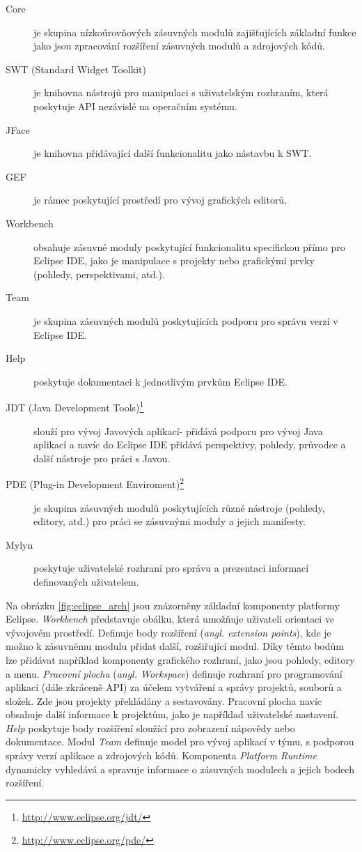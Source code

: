   \begin{description}
    \item[Core] je skupina nízkoúrovňových zásuvných modulů zajišťujících základní funkce jako jsou zpracování rozšíření zásuvných modulů a zdrojových kódů.
    \item[SWT (Standard Widget Toolkit)] je knihovna nástrojů pro manipulaci s uživatelským rozhraním, která poskytuje API nezávislé na operačním systému.
    \item[JFace] je knihovna přidávající další funkcionalitu jako nástavbu k SWT.
    \item[GEF] je rámec poskytující prostředí pro vývoj grafických editorů.
    \item[Workbench] obsahuje zásuvné moduly poskytující funkcionalitu specifickou přímo pro Eclipse IDE, jako je manipulace s projekty nebo grafickými prvky (pohledy, perspektivami, atd.).
    \item[Team] je skupina zásuvných modulů poskytujících podporu pro správu verzí v Eclipse IDE.
    \item[Help] poskytuje dokumentaci k jednotlivým prvkům Eclipse IDE.
    \item[JDT (Java Development Tools)\footnote{\url{http://www.eclipse.org/jdt/}}] slouží pro vývoj Javových aplikací- přidává podporu pro vývoj Java aplikací a navíc do Eclipse IDE přidává perspektivy, pohledy, průvodce a další nástroje pro práci s Javou.
    \item[PDE (Plug-in Development Enviroment)\footnote{\url{http://www.eclipse.org/pde/}}] je skupina zásuvných modulů poskytujících různé nástroje (pohledy, editory, atd.) pro práci se zásuvnými moduly a jejich manifesty.
    \item[Mylyn] poskytuje uživatelské rozhraní pro správu a prezentaci informací definovaných uživatelem.
  \end{description}

  Na obrázku \ref{fig:eclipse_arch} jsou znázorněny základní komponenty platformy Eclipse. \emph{Workbench} představuje obálku, která umožňuje uživateli orientaci ve vývojovém prostředí. Definuje body rozšíření (\emph{angl. extension points}), kde je možno k zásuvnému modulu přidat další, rozšiřující modul. Díky těmto bodům lze přidávat například komponenty grafického rozhraní, jako jsou pohledy, editory a menu. \emph{Pracovní plocha} (\emph{angl. Workspace}) definuje rozhraní pro programování aplikací (dále zkráceně API) za účelem vytváření a správy projektů, souborů a složek. Zde jsou projekty překládány a sestavovány. Pracovní plocha navíc obsahuje další informace k projektům, jako je například uživatelské nastavení. \emph{Help} poskytuje body rozšíření sloužící pro zobrazení nápovědy nebo dokumentace. Modul \emph{Team} definuje model pro vývoj aplikací v týmu, s podporou správy verzí aplikace a zdrojových kódů. Komponenta \emph{Platform Runtime} dynamicky vyhledává a spravuje informace o zásuvných modulech a jejich bodech rozšíření.

